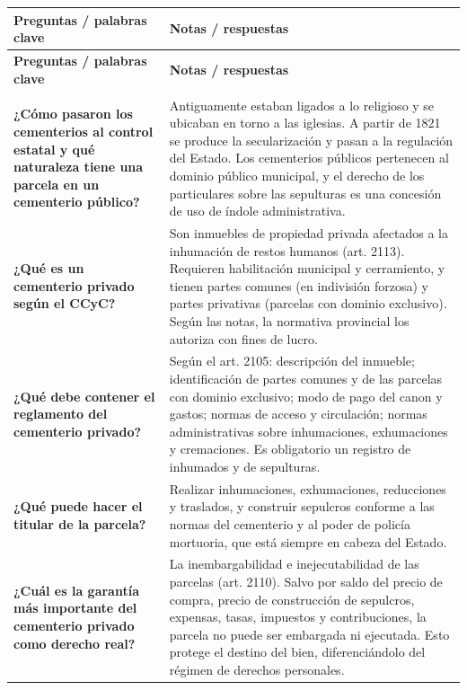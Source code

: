\documentclass[12pt,oneside]{book}
\begin{document}
\begin{longtable}{
    >{\raggedright\arraybackslash}p{}
    >{\raggedright\arraybackslash}p{}
}
\toprule
\textbf{Preguntas / palabras clave} & \textbf{Notas / respuestas} \\
\midrule
\endfirsthead
\toprule
\textbf{Preguntas / palabras clave} & \textbf{Notas / respuestas} \\
\midrule
\endhead
\midrule
\multicolumn{2}{r}{\small\textit{continúa en la página siguiente}} \\
\endfoot
\bottomrule
\endlastfoot

\textbf{¿Cómo pasaron los cementerios al control estatal y qué naturaleza tiene una parcela en un cementerio público?} &
Antiguamente estaban ligados a lo religioso y se ubicaban en torno a las iglesias. A partir de 1821 se produce la secularización y pasan a la regulación del Estado. Los cementerios públicos pertenecen al dominio público municipal, y el derecho de los particulares sobre las sepulturas es una concesión de uso de índole administrativa. \\[0.8em]

\textbf{¿Qué es un cementerio privado según el CCyC?} &
Son inmuebles de propiedad privada afectados a la inhumación de restos humanos (art. 2113). Requieren habilitación municipal y cerramiento, y tienen partes comunes (en indivisión forzosa) y partes privativas (parcelas con dominio exclusivo). Según las notas, la normativa provincial los autoriza con fines de lucro. \\[0.8em]

\textbf{¿Qué debe contener el reglamento del cementerio privado?} &
Según el art. 2105: descripción del inmueble; identificación de partes comunes y de las parcelas con dominio exclusivo; modo de pago del canon y gastos; normas de acceso y circulación; normas administrativas sobre inhumaciones, exhumaciones y cremaciones. Es obligatorio un registro de inhumados y de sepulturas. \\[0.8em]

\textbf{¿Qué puede hacer el titular de la parcela?} &
Realizar inhumaciones, exhumaciones, reducciones y traslados, y construir sepulcros conforme a las normas del cementerio y al poder de policía mortuoria, que está siempre en cabeza del Estado. \\[0.8em]

\textbf{¿Cuál es la garantía más importante del cementerio privado como derecho real?} &
La inembargabilidad e inejecutabilidad de las parcelas (art. 2110). Salvo por saldo del precio de compra, precio de construcción de sepulcros, expensas, tasas, impuestos y contribuciones, la parcela no puede ser embargada ni ejecutada. Esto protege el destino del bien, diferenciándolo del régimen de derechos personales. \\[0.8em]


\end{longtable}
\end{document}
